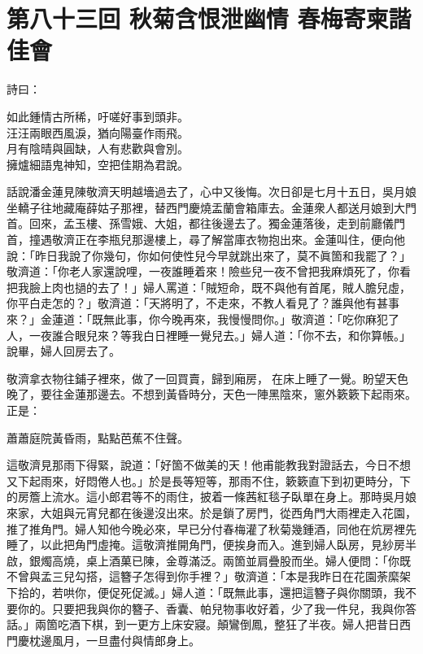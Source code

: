 
\chapter*{第八十三回 秋菊含恨泄幽情 春梅寄柬諧佳會}


詩曰：

\begin{myquote}
如此鍾情古所稀，吁嗟好事到頭非。\\汪汪兩眼西風淚，猶向陽臺作雨飛。\\月有陰晴與圓缺，人有悲歡與會別。\\擁爐細語鬼神知，空把佳期為君說。
\end{myquote}

話說潘金蓮見陳敬濟天明越墻過去了，心中又後悔。{}次日卻是七月十五日，吳月娘坐轎子往地藏庵薛姑子那裡，替西門慶燒盂蘭會箱庫去。金蓮衆人都送月娘到大門首。回來，孟玉樓、孫雪娥、大姐，都往後邊去了。獨金蓮落後，走到前廳儀門首，撞遇敬濟正在李瓶兒那邊樓上，尋了解當庫衣物抱出來。金蓮叫住，便向他說：「昨日我說了你幾句，你如何使性兒今早就跳出來了，莫不眞箇和我罷了？」敬濟道：「你老人家還說哩，一夜誰睡着來！險些兒一夜不曾把我麻煩死了，你看把我臉上肉也撾的去了！」婦人罵道：「賊短命，既不與他有首尾，賊人膽兒虛，你平白走怎的？」{}敬濟道：「天將明了，不走來，不教人看見了？誰與他有甚事來？」金蓮道：「既無此事，你今晚再來，我慢慢問你。」敬濟道：「吃你麻犯了人，一夜誰合眼兒來？等我白日裡睡一覺兒去。」婦人道：「你不去，和你算帳。」{}說畢，婦人回房去了。

敬濟拿衣物往鋪子裡來，做了一回買賣，歸到廂房，𢱉在床上睡了一覺。盼望天色晚了，要往金蓮那邊去。不想到黃昏時分，天色一陣黑陰來，窻外簌簌下起雨來。{}正是：

\begin{myquote}
蕭蕭庭院黃昏雨，點點芭蕉不住聲。
\end{myquote}

這敬濟見那雨下得緊，說道：「好箇不做美的天！他甫能教我對證話去，今日不想又下起雨來，好悶倦人也。」於是長等短等，那雨不住，簌簌直下到初更時分，下的房簷上流水。這小郎君等不的雨住，披着一條茜紅毯子臥單在身上。{}那時吳月娘來家，大姐與元宵兒都在後邊沒出來。於是鎖了房門，從西角門大雨裡走入花園，推了推角門。婦人知他今晚必來，早已分付春梅灌了秋菊幾鍾酒，同他在炕房裡先睡了，以此把角門虛掩。這敬濟推開角門，便挨身而入。進到婦人臥房，見紗房半啟，銀燭高燒，桌上酒菓已陳，金尊滿泛。兩箇並肩疊股而坐。婦人便問：「你既不曾與孟三兒勾搭，這簪子怎得到你手裡？」敬濟道：「本是我昨日在花園荼縻架下拾的，若哄你，便促死促滅。」婦人道：「既無此事，還把這簪子與你關頭，{}我不要你的。只要把我與你的簪子、香囊、帕兒物事收好着，少了我一件兒，我與你答話。」兩箇吃酒下棋，到一更方上床安寢。顛鸞倒鳳，整狂了半夜。婦人把昔日西門慶枕邊風月，一旦盡付與情郎身上。

